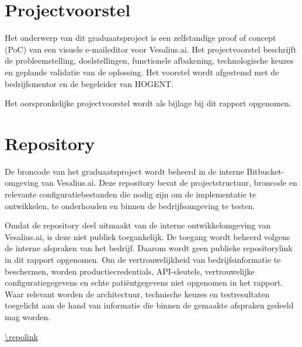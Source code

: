 \documentclass[dutch,dit,report]{hogentreport}
\begin{document}
\appendix

\chapter{Projectvoorstel}
Het onderwerp van dit graduaatsproject is een zelfstandige proof of concept
(PoC) van een visuele e-maileditor voor Vesalius.ai. Het projectvoorstel
beschrijft de probleemstelling, doelstellingen, functionele afbakening,
technologische keuzes en geplande validatie van de oplossing. Het voorstel
wordt afgestemd met de bedrijfsmentor en de begeleider van HOGENT.

Het oorspronkelijke projectvoorstel wordt als bijlage bij dit rapport
opgenomen. 



\chapter{Repository}
De broncode van het graduaatsproject wordt beheerd in de interne
Bitbucket-omgeving van Vesalius.ai. Deze repository bevat de projectstructuur,
broncode en relevante configuratiebestanden die nodig zijn om de implementatie
te ontwikkelen, te onderhouden en binnen de bedrijfsomgeving te testen.

Omdat de repository deel uitmaakt van de interne ontwikkelomgeving van
Vesalius.ai, is deze niet publiek toegankelijk. De toegang wordt beheerd
volgens de interne afspraken van het bedrijf. Daarom wordt geen publieke
repositorylink in dit rapport opgenomen. Om de vertrouwelijkheid van
bedrijfsinformatie te beschermen, worden productiecredentials, API-sleutels,
vertrouwelijke configuratiegegevens en echte patiëntgegevens niet opgenomen
in het rapport. Waar relevant worden de architectuur, technische keuzes en
testresultaten toegelicht aan de hand van informatie die binnen de gemaakte
afspraken gedeeld mag worden.

\begin{center}
    \url{\repolink}
\end{center}
\end{document}
